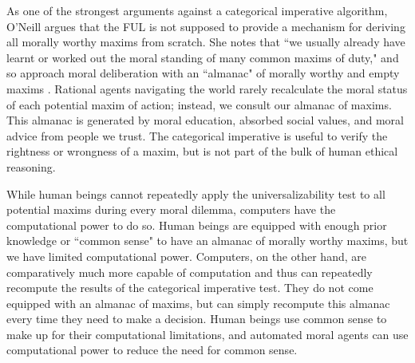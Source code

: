 \begin{isabellebody}
\begin{isamarkuptext}
As one of the strongest arguments against a categorical imperative algorithm, O'Neill argues that 
the FUL is not supposed to provide a mechanism for deriving all morally worthy maxims from scratch. She notes
that ``we usually already have learnt or worked out the moral standing of many common maxims of duty," 
and so approach moral deliberation with an ``almanac" of morally worthy and empty maxims \citep[394]{oneilluniversallaws}. Rational agents
navigating the world rarely recalculate the moral status of each potential maxim of action; instead, we consult our
almanac of maxims. This almanac is generated by moral education, absorbed social values, and moral advice
from people we trust. The categorical imperative is useful to verify the rightness or 
wrongness of a maxim, but is not part of the bulk of human ethical reasoning.

While human beings cannot repeatedly apply the universalizability test to all potential maxims during 
every moral dilemma, computers have the computational power to do so. Human beings are 
equipped with enough prior knowledge or ``common sense" to have an almanac of morally worthy maxims,
but we have limited computational power. Computers, on the other hand, are comparatively
much more capable of computation and thus can repeatedly recompute the results of the categorical
imperative test. They do not come equipped with an almanac of maxims, but can simply recompute this
almanac every time they need to make a decision. Human beings use common sense to make up for their computational
limitations, and automated moral agents can use computational power to reduce the need for common sense.


\end{isamarkuptext}
\end{isabellebody}
